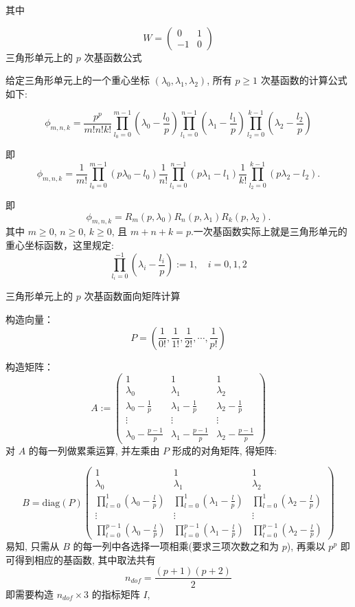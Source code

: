 \documentclass[12pt,a4paper]{article}
\begin{document}
其中 

$$
W = \begin{pmatrix}
0 & 1\\ -1 & 0 
\end{pmatrix}
$$
三角形单元上的 $p$ 次基函数公式

给定三角形单元上的一个重心坐标 $(\lambda_0, \lambda_1, \lambda_2)$, 所有 $p\geq 1$ 次基函数的计算公式如下:

$$
\phi_{m,n,k} = \frac{p^p}{m!n!k!}\prod_{l_0 = 0}^{m - 1}
(\lambda_0 - \frac{l_0}{p}) \prod_{l_1 = 0}^{n-1}(\lambda_1 -
\frac{l_1}{p}) \prod_{l_2=0}^{k-1}(\lambda_2 - \frac{l_2}{p})
$$

即
$$
\phi_{m,n,k} =\frac{1}{m!}\prod_{l_0 = 0}^{m - 1}(p\lambda_0 - l_0)\frac{1}{n!}\prod_{l_1 = 0}^{n - 1}(p\lambda_1 - l_1)\frac{1}{k!}\prod_{l_2 = 0}^{k - 1}(p\lambda_2 - l_2).
$$

即
$$
\phi_{m,n,k} =R_m (p,\lambda_0)R_n (p,\lambda_1)R_k (p,\lambda_2).
$$
其中 $ m\geq 0$, $n\geq 0$, $ k \geq 0$, 且 $m+n+k=p$.一次基函数实际上就是三角形单元的重心坐标函数，这里规定:
$$
 \prod_{l_i=0}^{-1}(\lambda_i - \frac{l_i}{p}) := 1,\quad i=0, 1, 2
$$

三角形单元上的 $p$ 次基函数面向矩阵计算

构造向量：
$$
P = ( \frac{1}{0!},  \frac{1}{1!}, \frac{1}{2!}, \cdots, \frac{1}{p!})
$$

构造矩阵：
$$
A :=                                                                            
\begin{pmatrix}  
1  &  1  & 1 \\
\lambda_0 & \lambda_1 & \lambda_2\\                                             
\lambda_0 - \frac{1}{p} & \lambda_1 - \frac{1}{p} & \lambda_2 - \frac{1}{p}\\   
\vdots & \vdots & \vdots \\                                                     
\lambda_0 - \frac{p - 1}{p} & \lambda_1 - \frac{p - 1}{p} & \lambda_2 - \frac{p - 1}{p}
\end{pmatrix}                                                                   
$$ 
对 $A$ 的每一列做累乘运算, 并左乘由 $P$ 形成的对角矩阵, 得矩阵:

$$
B = \mathrm{diag}(P)
\begin{pmatrix}
1 & 1 & 1 \\
\lambda_0 & \lambda_1 & \lambda_2\\
\prod_{l=0}^{1}(\lambda_0 - \frac{l}{p}) & \prod_{l=0}^{1}(\lambda_1 - \frac{l}{p})
& \prod_{l=0}^{1}(\lambda_2 - \frac{l}{p}) \\
\vdots & \vdots & \vdots \\
\prod_{l=0}^{p-1}(\lambda_0 - \frac{l}{p}) & \prod_{l=0}^{p-1}(\lambda_1 - \frac{l}{p})
& \prod_{l=0}^{p-1}(\lambda_2 - \frac{l}{p}) 
\end{pmatrix}
$$
易知, 只需从 $B$ 的每一列中各选择一项相乘(要求三项次数之和为 $p$), 再乘以 $p^p$ 即可得到相应的基函数, 其中取法共有 
$$
n_{dof} = \frac{(p+1)(p+2)}{2}
$$
即需要构造 $n_{dof}\times 3$ 的指标矩阵 $I$, 
\end{document}
